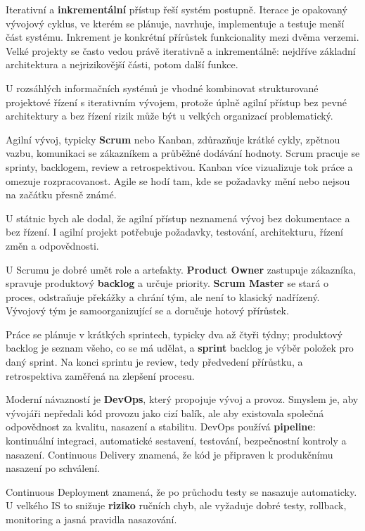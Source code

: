 Iterativní a \textbf{inkrementální} přístup řeší systém postupně. Iterace je opakovaný vývojový cyklus, ve kterém se plánuje, navrhuje, implementuje a testuje menší část systému. Inkrement je konkrétní přírůstek funkcionality mezi dvěma verzemi. Velké projekty se často vedou právě iterativně a inkrementálně: nejdříve základní architektura a nejrizikovější části, potom další funkce.

U rozsáhlých informačních systémů je vhodné kombinovat strukturované projektové řízení s iterativním vývojem, protože úplně agilní přístup bez pevné architektury a bez řízení rizik může být u velkých organizací problematický.

Agilní vývoj, typicky \textbf{Scrum} nebo Kanban, zdůrazňuje krátké cykly, zpětnou vazbu, komunikaci se zákazníkem a průběžné dodávání hodnoty. Scrum pracuje se sprinty, backlogem, review a retrospektivou. Kanban více vizualizuje tok práce a omezuje rozpracovanost. Agile se hodí tam, kde se požadavky mění nebo nejsou na začátku přesně známé.

U státnic bych ale dodal, že agilní přístup neznamená vývoj bez dokumentace a bez řízení. I agilní projekt potřebuje požadavky, testování, architekturu, řízení změn a odpovědnosti.

U Scrumu je dobré umět role a artefakty. \textbf{Product Owner} zastupuje zákazníka, spravuje produktový \textbf{backlog} a určuje priority. \textbf{Scrum Master} se stará o proces, odstraňuje překážky a chrání tým, ale není to klasický nadřízený. Vývojový tým je samoorganizující se a doručuje hotový přírůstek.

Práce se plánuje v krátkých sprintech, typicky dva až čtyři týdny; produktový backlog je seznam všeho, co se má udělat, a \textbf{sprint} backlog je výběr položek pro daný sprint. Na konci sprintu je review, tedy předvedení přírůstku, a retrospektiva zaměřená na zlepšení procesu.

Moderní návazností je \textbf{DevOps}, který propojuje vývoj a provoz. Smyslem je, aby vývojáři nepředali kód provozu jako cizí balík, ale aby existovala společná odpovědnost za kvalitu, nasazení a stabilitu. DevOps používá \textbf{pipeline}: kontinuální integraci, automatické sestavení, testování, bezpečnostní kontroly a nasazení. Continuous Delivery znamená, že kód je připraven k produkčnímu nasazení po schválení.

Continuous Deployment znamená, že po průchodu testy se nasazuje automaticky. U velkého IS to snižuje \textbf{riziko} ručních chyb, ale vyžaduje dobré testy, rollback, monitoring a jasná pravidla nasazování.

